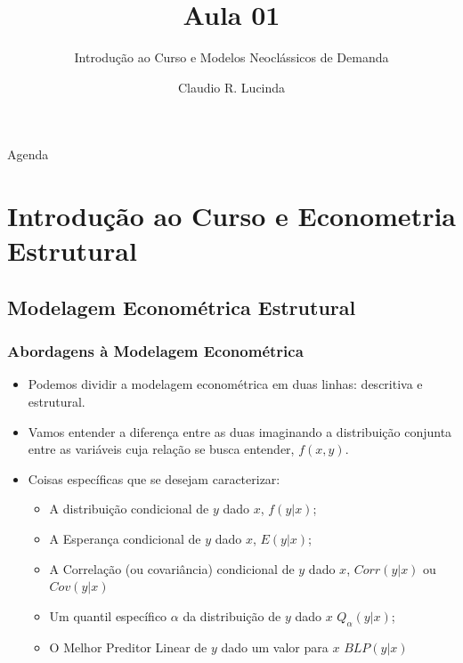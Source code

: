 \documentclass{beamer}
\title{Aula 01}
\subtitle{Introdução ao Curso e Modelos Neoclássicos de Demanda}
\author{Claudio R. Lucinda}
\institute{FEA-RP/USP}
\date{}
\begin{document}
\frame{\titlepage}
\begin{frame}{Agenda}
	\tableofcontents[pausesections]
\end{frame}

\section{Introdução ao Curso e Econometria Estrutural}

\subsection{Modelagem Econométrica Estrutural}

\begin{frame}[fragile]\frametitle{Abordagens à Modelagem Econométrica}
\begin{itemize}
  \item Podemos dividir a modelagem econométrica em duas linhas: descritiva e estrutural. 
  \item Vamos entender a diferença entre as duas imaginando a distribuição conjunta entre as variáveis cuja relação se busca entender, $f(x,y)$.
  \item Coisas específicas que se desejam caracterizar:
  \begin{itemize}
    \item A distribuição condicional de $y$ dado $x$, $f(y|x)$;
    \item A Esperança condicional de $y$ dado $x$, $E(y|x)$;
    \item A Correlação (ou covariância) condicional de $y$ dado $x$, $Corr(y|x)$ ou $Cov(y|x)$
    \item Um quantil específico $\alpha$ da distribuição de $y$ dado $x$ $Q_{\alpha}(y|x)$;
    \item O Melhor Preditor Linear de $y$ dado um valor para $x$ $BLP(y|x)$
  \end{itemize}
\end{itemize}
\end{frame}
\end{document}
